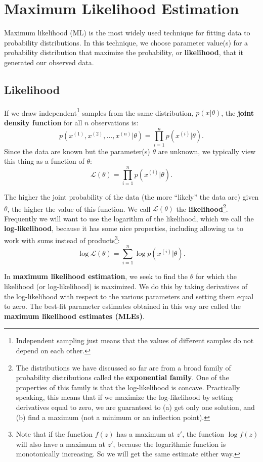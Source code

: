 \chapter{Maximum Likelihood Estimation \label{chapter:mlebasics}}

Maximum likelihood (ML) is the most widely used technique for fitting data to probability distributions. In this technique, we choose parameter value(s) for a probability distribution that maximize the probability, or \textbf{likelihood}, that it generated our observed data.

\section{Likelihood}

If we draw independent\footnote{Independent sampling just means that the values of different samples do not depend on each other.} samples from the same distribution, $p(x|\theta)$, the {\bf joint density function} for all $n$ observations is:
$$ p(x^{(1)}, x^{(2)}, \dots, x^{(n)}|\theta) = \prod_{i=1}^n p(x^{(i)}|\theta). $$
Since the data are known but the parameter(s) $\theta$ are unknown, we typically view this thing as a function of $\theta$:
$$ \mathcal{L}(\theta) = \prod_{i=1}^n p(x^{(i)}|\theta). $$

The higher the joint probability of the data (the more ``likely'' the data are) given $\theta$, the higher the value of this function. We call $\mathcal{L}(\theta)$ the \textbf{likelihood}\footnote{The distributions we have discussed so far are from a broad family of probability distributions called the {\bf exponential family}. One of the properties of this family is that the log-likelihood is concave. Practically speaking, this means that if we maximize the log-likelihood by setting derivatives equal to zero, we are guaranteed to (a) get only one solution, and (b) find a maximum (not a minimum or an inflection point).}. Frequently we will want to use the logarithm of the likelihood, which we call the \textbf{log-likelihood}, because it has some nice properties, including allowing us to work with sums instead of products\footnote{Note that if the function $f(z)$ has a maximum at $z'$, the function $\log f(z)$ will also have a maximum at $z'$, because the logarithmic function is monotonically increasing. So we will get the same estimate either way.}:
$$ \log \mathcal{L}(\theta) = \sum_{i=1}^n \log p(x^{(i)}|\theta). $$

In {\bf maximum likelihood estimation}, we seek to find the $\theta$ for which the likelihood (or log-likelihood) is maximized. We do this by taking derivatives of the log-likelihood with respect to the various parameters and setting them equal to zero. The best-fit parameter estimates obtained in this way are called the \textbf{maximum likelihood estimates (MLEs)}. 

